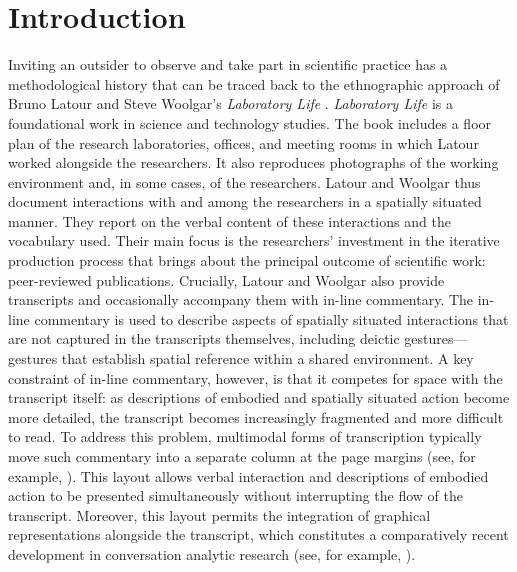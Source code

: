 \documentclass{inggrid}
\begin{document}
\null


\thispagestyle{inggrid}



\FDIJumpToAll

\section{Introduction}
\label{sec:introduction}
Inviting an outsider to observe and take part in scientific practice has a methodological history that can be traced back to the ethnographic approach of Bruno Latour and Steve Woolgar’s \textit{Laboratory Life} \cite{latour_laboratory_1979, latour_laboratory_1986}. 
\textit{Laboratory Life} is a foundational work in science and technology studies.
The book includes a floor plan of the research laboratories, offices, and meeting rooms in which Latour worked alongside the researchers. 
It also reproduces photographs of the working environment and, in some cases, of the researchers. 
Latour and Woolgar thus document interactions with and among the researchers in a spatially situated manner. 
They report on the verbal content of these interactions and the vocabulary used.
Their main focus is the researchers’ investment in the iterative production process that brings about the principal outcome of scientific work: peer-reviewed publications. 
Crucially, Latour and Woolgar also provide transcripts and occasionally accompany them with in-line commentary. 
The in-line commentary is used to describe aspects of spatially situated interactions that are not captured in the transcripts themselves, including deictic gestures---gestures that establish spatial reference within a shared environment.
A key constraint of in-line commentary, however, is that it competes for space with the transcript itself: 
as descriptions of embodied and spatially situated action become more detailed, the transcript becomes increasingly fragmented and more difficult to read. 
To address this problem, multimodal forms of transcription typically move such commentary into a separate column at the page margins (see, for example, \cite{edwards_common_1987}). 
This layout allows verbal interaction and descriptions of embodied action to be presented simultaneously without interrupting the flow of the transcript.
Moreover, this layout permits the integration of graphical representations alongside the transcript, which constitutes a comparatively recent development in conversation analytic research (see, for example, \cite{hormeyer_einsatz_2015}).
\end{document}
